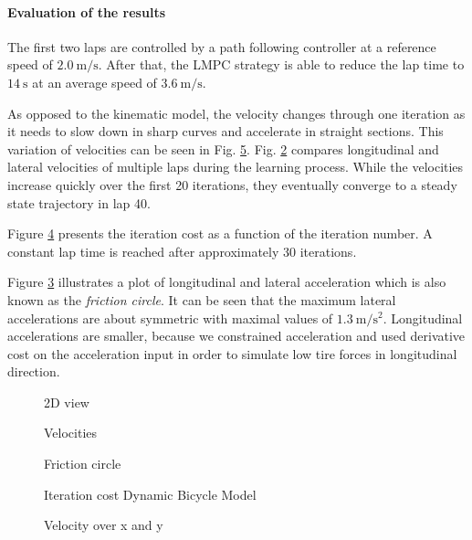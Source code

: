 \paragraph{Evaluation of the results}The first two laps are controlled by a path following controller at a reference speed of $\SI{2.0}{\meter\per\second}$. After that, the LMPC strategy is able to reduce the lap time to $\SI{14}{\second}$ at an average speed of $\SI{3.6}{\meter\per\second}$.

As opposed to the kinematic model, the velocity changes through one iteration as it needs to slow down in sharp curves and accelerate in straight sections. This variation of velocities can be seen in Fig. \ref{fig:SimDyn_v_over_xy}. Fig. \ref{fig:SimDyn_v} compares longitudinal and lateral velocities of multiple laps during the learning process. While the velocities increase quickly over the first 20 iterations, they eventually converge to a steady state trajectory in lap 40.

Figure \ref{fig:SimDyn_cost} presents the iteration cost as a function of the iteration number. A constant lap time is reached after approximately 30 iterations.

Figure \ref{fig:SimDyn_fcircle} illustrates a plot of longitudinal and lateral acceleration which is also known as the \emph{friction circle}. It can be seen that the maximum lateral accelerations are about symmetric with maximal values of $\SI{1.3}{\meter\per\square\second}$. Longitudinal accelerations are smaller, because we constrained acceleration and used derivative cost on the acceleration input in order to simulate low tire forces in longitudinal direction.
\begin{figure}[ht]
	\centering
  	
	\caption{2D view}
	\label{fig:SimDyn_xy}
\end{figure}

%  	

\begin{figure}[ht]
	\centering
  	
	\caption{Velocities}
	\label{fig:SimDyn_v}
\end{figure}

\begin{figure}[ht]
	\centering
  	
	\caption{Friction circle}
	\label{fig:SimDyn_fcircle}
\end{figure}

\begin{figure}[ht]
	\centering
  	
	\caption{Iteration cost Dynamic Bicycle Model}
	\label{fig:SimDyn_cost}
\end{figure}

\begin{figure}[ht]
	\centering
  	
	\caption{Velocity over x and y}
	\label{fig:SimDyn_v_over_xy}
\end{figure}

